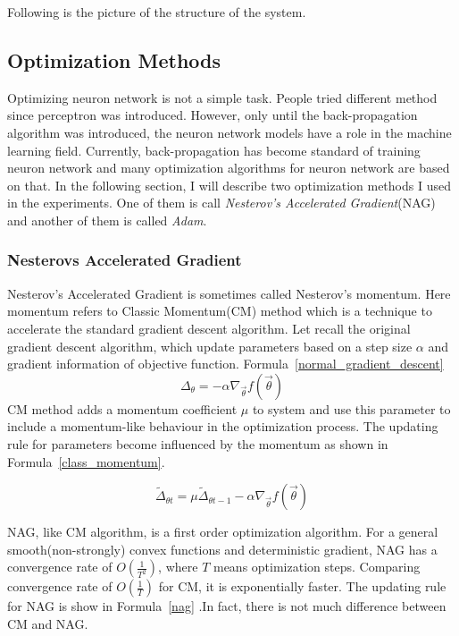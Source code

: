 \documentclass[officiallayout]{tktla}
\begin{document}
Following is the picture of the structure of the system. 

\subsection{Optimization Methods}
Optimizing neuron network is not a simple task. People tried different method since perceptron was introduced. However, only until the back-propagation algorithm was introduced, the neuron network models have a role in the machine learning field. Currently, back-propagation has become standard of training neuron network and many optimization algorithms for neuron network are based on that. In the following section, I will describe two optimization methods I used in the experiments. One of them is call \textit{Nesterov's Accelerated Gradient}(NAG) and another of them is called \textit{Adam}. 
\subsubsection{Nesterovs Accelerated Gradient}
Nesterov's Accelerated Gradient is sometimes called Nesterov's momentum. Here momentum refers to Classic Momentum(CM) method which is a technique to accelerate the standard gradient descent algorithm. Let recall the original gradient descent algorithm, which update parameters based on a step size $\alpha$ and gradient information of objective function. Formula~\ref{normal_gradient_descent}
\begin{equation}
\Delta_\theta = -\alpha \nabla_{\vec{\theta}} f(\vec{\theta})
\label{normal_gradient_descent}
\end{equation}
CM method adds a momentum coefficient $\mu$ to system and use this parameter to include a momentum-like behaviour in the optimization process. The updating rule for parameters become influenced by the momentum as shown in Formula~\ref{class_momentum}.

\begin{equation}
\widetilde{\Delta}_{\theta t} =  \mu \widetilde{\Delta}_{\theta {t-1}}  -\alpha \nabla_{\vec{\theta}} f(\vec{\theta})
\label{class_momentum}
\end{equation}

NAG, like CM algorithm, is a first order optimization algorithm. For a general smooth(non-strongly) convex functions and deterministic gradient, NAG has a convergence rate of $O(\frac{1}{T^2})$, where $T$ means optimization steps. Comparing convergence rate of $O(\frac{1}{T})$ for CM, it is exponentially faster. The updating rule for NAG is show in Formula~\ref{nag} .In fact, there is not much difference between CM and NAG. 
\end{document}
